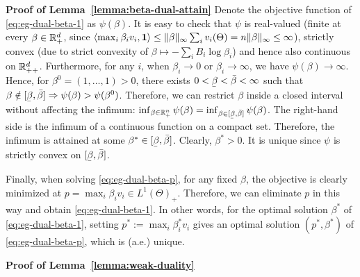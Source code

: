 	\smallskip\noindent\textbf{Proof of Lemma~\ref{lemma:beta-dual-attain}}
	Denote the objective function of \eqref{eq:eg-dual-beta-1} as $\psi(\beta)$. It is easy to check that $\psi$ is real-valued (finite at every $\beta\in \mathbb{R}^d_+$, since $\langle \max_i \beta_i v_i, \mathbf{1} \rangle \leq \|\beta\|_\infty \sum_i v_i(\Theta) = n \|\beta\|_\infty \leq \infty $), strictly convex (due to strict convexity of $\beta\mapsto -\sum_i B_i \log \beta_i$) and hence also continuous on $\mathbb{R}^d_{++}$.
	Furthermore, for any $i$, when $\beta_i\rightarrow 0$ or $\beta_i \rightarrow \infty$, we have $\psi(\beta) \rightarrow \infty$.
	Hence, for $\beta^0 = (1, \dots, 1)>0$, there exists $0 < \ubar{\beta} < \bar{\beta} < \infty$ such that 
	$\beta\notin [\ubar{\beta}, \bar{\beta}] \Rightarrow \psi(\beta) > \psi(\beta^0)$.
	Therefore, we can restrict $\beta$ inside a closed interval without affecting the infimum:
	$ \inf_{\beta\in \RR_+^n } \psi(\beta) = \inf_{\beta\in [\ubar{\beta}, \bar{\beta}] }\psi(\beta)$. 
	The right-hand side is the infimum of a continuous function on a compact set. Therefore, the infimum is attained at some $\beta^* \in [\ubar{\beta}, \bar{\beta}]$. Clearly, $\beta^* > 0$. It is unique since $\psi$ is strictly convex on $[\ubar{\beta}, \bar{\beta}]$.
	
	Finally, when solving \eqref{eq:eg-dual-beta-p}, for any fixed $\beta$, the objective is clearly minimized at $p = \max_i \beta_i v_i \in L^1(\Theta)_+$. Therefore, we can eliminate $p$ in this way and obtain \eqref{eq:eg-dual-beta-1}. In other words, for the optimal solution $\beta^*$ of \eqref{eq:eg-dual-beta-1}, setting $p^* := \max_i \beta^*_i v_i$ gives an optimal solution $(p^*, \beta^*)$ of \eqref{eq:eg-dual-beta-p}, which is (a.e.) unique. 

	\smallskip\noindent\textbf{Proof of Lemma~\ref{lemma:weak-duality}}


